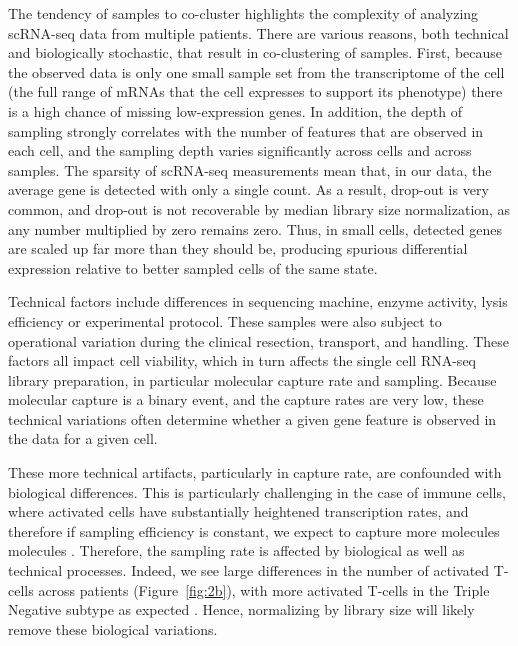 The tendency of samples to co-cluster highlights the complexity of analyzing scRNA-seq data from multiple patients.
There are various reasons, both technical and biologically stochastic, that result in co-clustering of samples. 
First, because the observed data is only one small sample set from the transcriptome of the cell (the full range of mRNAs that the cell expresses to support its phenotype) there is a high chance of missing low-expression genes. 
In addition, the depth of sampling strongly correlates with the number of features that are observed in each cell, and the sampling depth varies significantly across cells and across samples. %
The sparsity of scRNA-seq measurements mean that, in our data, the average gene is detected with only a single count. 
As a result, drop-out is very common, and drop-out is not recoverable by median library size normalization, as any number multiplied by zero remains zero. 
Thus, in small cells, detected genes are scaled up far more than they should be, producing spurious differential expression relative to better sampled cells of the same state. %

Technical factors include differences in sequencing machine, enzyme activity, lysis efficiency or experimental protocol. 
These samples were also subject to operational variation during the clinical resection, transport, and handling. These factors all impact cell viability, which in turn affects the single cell RNA-seq library preparation, in particular molecular capture rate and sampling. 
Because molecular capture is a binary event, and the capture rates are very low, these technical variations often determine whether a given gene feature is observed in the data for a given cell.

These more technical artifacts, particularly in capture rate, are confounded with biological differences. 
This is particularly challenging in the case of immune cells, where activated cells have substantially heightened transcription rates, and therefore if sampling efficiency is constant, we expect to capture more molecules molecules \citep{Blackinton2016,Cheadle2005,Singer2016}. 
Therefore, the sampling rate is affected by biological as well as technical processes. 
Indeed, we see large differences in the number of activated T-cells across patients (Figure~\ref{fig:2b}), with more activated T-cells in the Triple Negative subtype as expected \citep{Dushyanthen2015}.
Hence, normalizing by library size will likely remove these biological variations.

